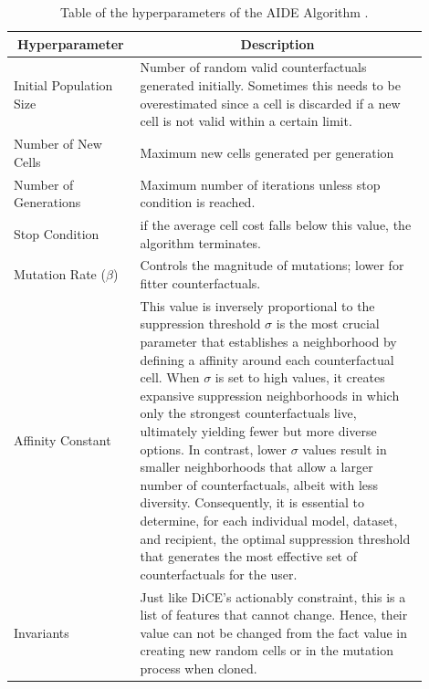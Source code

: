 \begin{table}[h]
\centering
\begin{tabular}{|p{0.25\linewidth}|p{0.65\linewidth}|}
\hline
\multicolumn{1}{|c|}{\textbf{Hyperparameter}} & \multicolumn{1}{c|}{\textbf{Description}} \\
\hline
Initial Population Size
& Number of random valid counterfactuals generated initially. Sometimes this needs to be overestimated since a cell is discarded if a new cell is not valid within a certain limit. \\
\hline
Number of New Cells
& Maximum new cells generated per generation\\
\hline
Number of Generations
& Maximum number of iterations unless stop condition is reached. \\
\hline
Stop Condition &  if the average cell cost falls below this value, the algorithm terminates. \\
\hline
Mutation Rate ($\beta$)
& Controls the magnitude of mutations; lower for fitter counterfactuals. \\
\hline
Affinity Constant
& This value is inversely proportional to the suppression threshold $\sigma$ is the most crucial parameter that establishes a neighborhood by defining a affinity around each counterfactual cell. When $\sigma$ is set to high values, it creates expansive suppression neighborhoods in which only the strongest counterfactuals live, ultimately yielding fewer but more diverse options. In contrast, lower $\sigma$ values result in smaller neighborhoods that allow a larger number of counterfactuals, albeit with less diversity. Consequently, it is essential to determine, for each individual model, dataset, and recipient, the optimal suppression threshold that generates the most effective set of counterfactuals for the user. \\
\hline
Invariants
&
Just like DiCE's actionably constraint, this is a list of features that cannot change. Hence, their value
can not be changed from the fact value in creating new random
cells or in the mutation process when cloned. \\
\hline
\end{tabular}
\caption{Table of the hyperparameters of the AIDE Algorithm \citep{forrest2021contrastive}.}
\label{tab:hyperparams}
\end{table}

